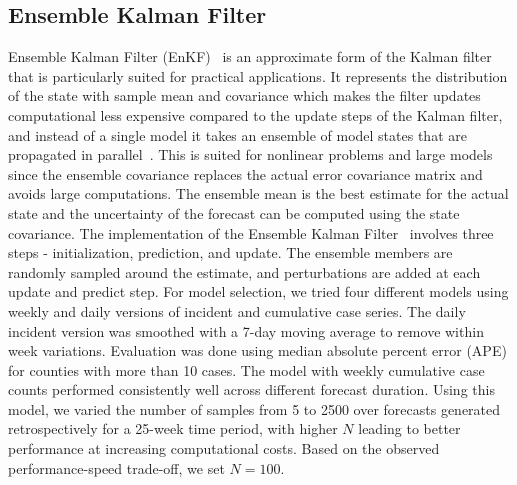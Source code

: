 \documentclass[sigconf]{acmart}
\begin{document}
\subsection{Ensemble Kalman Filter}
Ensemble Kalman Filter (EnKF)~\cite{burgers1998analysis} is an approximate form of the Kalman filter that is particularly suited for practical applications. It represents the distribution of the state with sample mean and covariance which makes the filter updates computational less expensive compared to the update steps of the Kalman filter, and instead of a single model it takes an ensemble of model states that are propagated in parallel~\cite{YANG2020563}. This is suited for nonlinear problems and large models since the ensemble covariance replaces the actual error covariance matrix and avoids large computations. The ensemble mean is the best estimate for the actual state and the uncertainty of the forecast can be computed using the state covariance.  The implementation of the Ensemble Kalman Filter~\cite{rlabbe, filterpy} involves three steps - initialization, prediction, and update. The ensemble members are randomly sampled around the estimate, and perturbations are added at each update and predict step. For model selection, we tried four different models using weekly and daily versions of incident and cumulative case series. The daily incident version was smoothed with a 7-day moving average to remove within week variations.  Evaluation was done using median absolute percent error (APE) for counties with more than 10 cases. The model with weekly cumulative case counts performed consistently well across different forecast duration. Using this model, we varied the number of samples from 5 to 2500 over forecasts generated retrospectively for a 25-week time period, with higher $N$ leading to better performance at increasing computational costs. Based on the observed performance-speed trade-off, we set $N=100$. 
\end{document}
